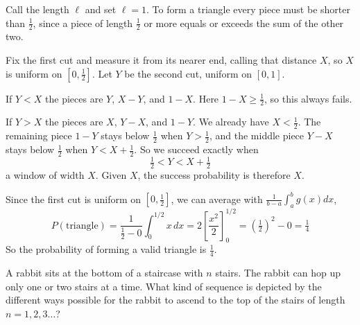 \begin{solution}
Call the length $\ell$ and set $\ell = 1$. To form a triangle every piece must
be shorter than $\tfrac12$, since a piece of length $\tfrac12$ or more equals or
exceeds the sum of the other two.

Fix the first cut and measure it from its nearer end, calling that distance $X$,
so $X$ is uniform on $[0, \tfrac12]$. Let $Y$ be the second cut, uniform on
$[0,1]$.

If $Y < X$ the pieces are $Y$, $X - Y$, and $1 - X$. Here $1 - X \ge \tfrac12$, so
this always fails.

If $Y > X$ the pieces are $X$, $Y - X$, and $1 - Y$. We already have $X < \tfrac12$.
The remaining piece $1 - Y$ stays below $\tfrac12$ when $Y > \tfrac12$, and the
middle piece $Y - X$ stays below $\tfrac12$ when $Y < X + \tfrac12$. So we succeed
exactly when
\[
  \tfrac12 < Y < X + \tfrac12
\]
a window of width $X$. Given $X$, the success probability is therefore $X$.

Since the first cut is uniform on $[0, \tfrac12]$, we can average with $\frac{1}{b-a} \int_a^b g(x)dx$,
\[
  P(\text{triangle}) = \frac{1}{\frac{1}{2} - 0}\int_0^{1/2} x\, dx
  = 2\left[\frac{x^2}{2}\right]_0^{1/2} = \left(\tfrac12\right)^2 - 0 = \tfrac14
\]
So the probability of forming a valid triangle is $\tfrac14$.
\end{solution}

\begin{problem}
A rabbit sits at the bottom of a staircase with $n$ stairs. The rabbit can hop up only one or two stairs at a time. What kind of sequence is depicted by the different ways possible for the rabbit to ascend to the top of the stairs of length $n=1,2,3\dots$?
\end{problem}


